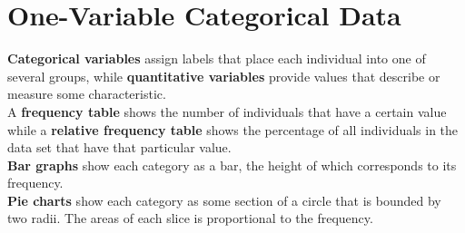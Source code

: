 \documentclass[../AP_Statistics.tex]{subfiles}
\begin{document}
	\chapter{One-Variable Categorical Data}
		\textbf{Categorical variables} assign labels that place each individual into one of several groups, while \textbf{quantitative variables} provide values that describe or measure some characteristic. \\
		A \textbf{frequency table} shows the number of individuals that have a certain value while a \textbf{relative frequency table} shows the percentage of all individuals in the data set that have that particular value. \\
		\textbf{Bar graphs} show each category as a bar, the height of which corresponds to its frequency. \\
		\textbf{Pie charts} show each category as some section of a circle that is bounded by two radii. The areas of each slice is proportional to the frequency. \\
\end{document}
